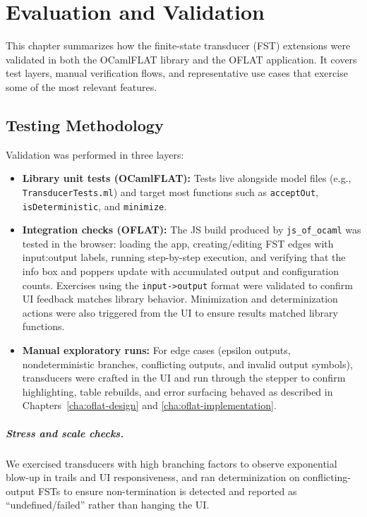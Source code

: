 
\chapter{Evaluation and Validation}
\label{cha:evaluation}

This chapter summarizes how the finite-state transducer (FST) extensions were validated in both the OCamlFLAT library and
the OFLAT application. It covers test layers, manual verification flows, and representative use cases that exercise some of the
most relevant features.

\section{Testing Methodology}
\label{sec:eval_methodology}

Validation was performed in three layers:
\begin{itemize}
  \item \textbf{Library unit tests (OCamlFLAT):} Tests live alongside model files
    (e.g., \texttt{TransducerTests.ml}) and target most functions such as \texttt{acceptOut}, \texttt{isDeterministic},
    and \texttt{minimize}.
  \item \textbf{Integration checks (OFLAT):} The JS build produced by \texttt{js\_of\_ocaml} was tested in the
  browser: loading the app, creating/editing FST edges with input:output labels, running step-by-step execution, and
  verifying that the info box and poppers update with accumulated output and configuration counts. Exercises using the
      \texttt{input->output} format were validated to confirm UI feedback matches library behavior. Minimization and
  determinization actions were also triggered from the UI to ensure results matched library functions.
  \item \textbf{Manual exploratory runs:} For edge cases (epsilon outputs, nondeterministic branches, conflicting outputs,
    and invalid output symbols), transducers were crafted in the UI and run through the stepper to confirm highlighting,
    table rebuilds, and error surfacing behaved as described in Chapters~\ref{cha:oflat-design} and \ref{cha:oflat-implementation}.
\end{itemize}

\paragraph{Stress and scale checks.}
We exercised transducers with high branching factors to observe exponential blow-up in trails and UI responsiveness, and ran determinization on conflicting-output FSTs to ensure non-termination is detected and reported as “undefined/failed” rather than hanging the UI.

